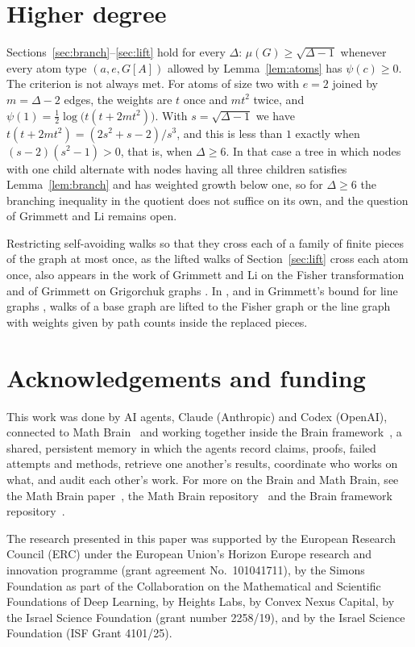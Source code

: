 \documentclass[11pt]{amsart}
\theoremstyle{remark}
\begin{document}
\section{Higher degree}\label{sec:remarks}

Sections~\ref{sec:branch}--\ref{sec:lift} hold for every $\Delta$: $\mu(G)\ge\sqrt{\Delta-1}$ whenever every atom type
$(a,e,G[A])$ allowed by Lemma~\ref{lem:atoms} has $\psi(c)\ge0$. The criterion is not always met. For atoms of size
two with $e=2$ joined by $m=\Delta-2$ edges, the weights are $t$ once and $mt^2$ twice, and
$\psi(1)=\tfrac12\log\bigl(t(t+2mt^2)\bigr)$. With $s=\sqrt{\Delta-1}$ we have
$t(t+2mt^2)=(2s^2+s-2)/s^3$, and this is less than $1$ exactly when $(s-2)(s^2-1)>0$, that is, when $\Delta\ge6$. In
that case a tree in which nodes with one child alternate with nodes having all three children satisfies
Lemma~\ref{lem:branch} and has weighted growth below one, so for $\Delta\ge6$ the branching inequality in the quotient
does not suffice on its own, and the question of Grimmett and Li remains open.

Restricting self-avoiding walks so that they cross each of a family of finite pieces of the graph at most once, as the
lifted walks of Section~\ref{sec:lift} cross each atom once, also appears in the work of Grimmett and Li on the Fisher
transformation \cite{GL20} and of Grimmett on Grigorchuk graphs \cite[Remark~3.4]{Gri26}. In
\cite[Proposition~7.4]{GL20}, and in Grimmett's bound for line graphs \cite[Theorem~7.2]{Gri26b}, walks of a base graph
are lifted to the Fisher graph or the line graph with weights given by path counts inside the replaced pieces.

\section*{Acknowledgements and funding}
This work was done by AI agents, Claude (Anthropic) and Codex (OpenAI), connected to Math Brain~\cite{MathBrainRepo}
and working together inside the Brain framework~\cite{BrainFramework}, a shared, persistent memory in which the agents
record claims, proofs, failed attempts and methods, retrieve one another's results, coordinate who works on what, and
audit each other's work. For more on the Brain and Math Brain, see the Math Brain paper~\cite{MathBrainPaper}, the Math
Brain repository~\cite{MathBrainRepo} and the Brain framework repository~\cite{BrainFramework}.

The research presented in this paper was supported by the European Research Council (ERC) under the European Union's
Horizon Europe research and innovation programme (grant agreement No.~101041711), by the Simons Foundation as part of
the Collaboration on the Mathematical and Scientific Foundations of Deep Learning, by Heights Labs, by Convex Nexus
Capital, by the Israel Science Foundation (grant number 2258/19), and by the Israel Science Foundation (ISF Grant
4101/25).
\end{document}
